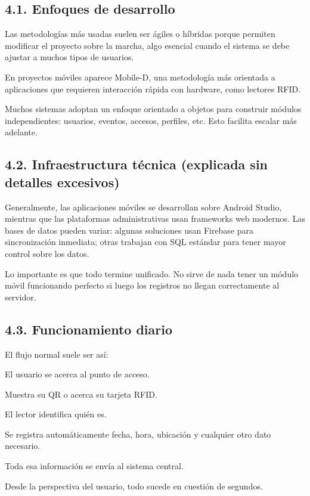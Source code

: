 \documentclass{article}
\begin{document}
\subsection{4.1. Enfoques de desarrollo}

Las metodologías más usadas suelen ser ágiles o híbridas porque permiten modificar el proyecto sobre la marcha, algo esencial cuando el sistema se debe ajustar a muchos tipos de usuarios.

En proyectos móviles aparece Mobile-D, una metodología más orientada a aplicaciones que requieren interacción rápida con hardware, como lectores RFID.

Muchos sistemas adoptan un enfoque orientado a objetos para construir módulos independientes: usuarios, eventos, accesos, perfiles, etc. Esto facilita escalar más adelante.

\subsection{4.2. Infraestructura técnica (explicada sin detalles excesivos)}

Generalmente, las aplicaciones móviles se desarrollan sobre Android Studio, mientras que las plataformas administrativas usan frameworks web modernos. Las bases de datos pueden variar: algunas soluciones usan Firebase para sincronización inmediata; otras trabajan con SQL estándar para tener mayor control sobre los datos.

Lo importante es que todo termine unificado. No sirve de nada tener un módulo móvil funcionando perfecto si luego los registros no llegan correctamente al servidor.

\subsection{4.3. Funcionamiento diario}

El flujo normal suele ser así:

El usuario se acerca al punto de acceso.

Muestra su QR o acerca su tarjeta RFID.

El lector identifica quién es.

Se registra automáticamente fecha, hora, ubicación y cualquier otro dato necesario.

Toda esa información se envía al sistema central.

Desde la perspectiva del usuario, todo sucede en cuestión de segundos.
\end{document}
